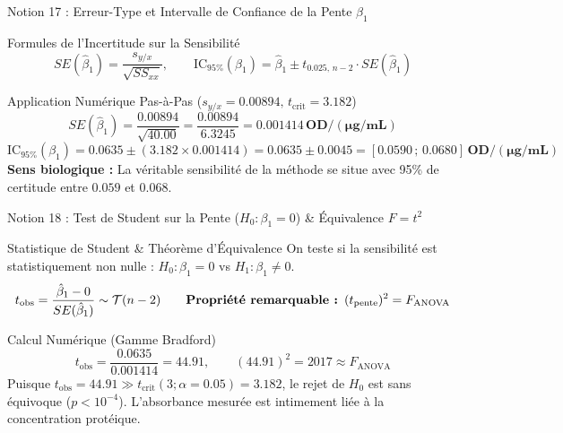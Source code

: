 \documentclass[aspectratio=169,10pt]{beamer}
\begin{document}
\begin{frame}{Notion 17 : Erreur-Type et Intervalle de Confiance de la Pente $\hat{\beta}_1$}
  \begin{conceptbox}{Formules de l'Incertitude sur la Sensibilité}
    \footnotesize
    \begin{equation*}
      SE(\hat{\beta}_1) = \frac{s_{y/x}}{\sqrt{SS_{xx}}}, \qquad \text{IC}_{95\%}(\beta_1) = \hat{\beta}_1 \pm t_{0.025, \, n-2} \cdot SE(\hat{\beta}_1)
    \end{equation*}
  \end{conceptbox}
  \vspace{1mm}
  \begin{biobox}{Application Numérique Pas-à-Pas ($s_{y/x} = 0.00894, \, t_{\text{crit}} = 3.182$)}
    \footnotesize
    \begin{equation*}
      SE(\hat{\beta}_1) = \frac{0.00894}{\sqrt{40.00}} = \frac{0.00894}{6.3245} = \mathbf{0.001414\,\text{OD}/(\mu\text{g/mL})}
    \end{equation*}
    \begin{equation*}
      \text{IC}_{95\%}(\beta_1) = 0.0635 \pm (3.182 \times 0.001414) = 0.0635 \pm 0.0045 = \mathbf{[0.0590 \,;\, 0.0680]\,\text{OD}/(\mu\text{g/mL})}
    \end{equation*}
    \textbf{Sens biologique :} La véritable sensibilité de la méthode se situe avec 95\% de certitude entre $0.059$ et $0.068$.
  \end{biobox}
\end{frame}

\begin{frame}{Notion 18 : Test de Student sur la Pente ($H_0: \beta_1 = 0$) \& Équivalence $F = t^2$}
  \begin{conceptbox}{Statistique de Student \& Théorème d'Équivalence}
    \footnotesize
    On teste si la sensibilité est statistiquement non nulle : $H_0 : \beta_1 = 0$ vs $H_1 : \beta_1 \neq 0$.
    \begin{equation*}
      t_{\text{obs}} = \frac{\hat{\beta}_1 - 0}{SE(\hat{\beta}_1)} \sim \mathcal{T}(n - 2) \qquad \text{\textbf{Propriété remarquable : }} (t_{\text{pente}})^2 = F_{\text{ANOVA}}
    \end{equation*}
  \end{conceptbox}
  \vspace{1mm}
  \begin{biobox}{Calcul Numérique (Gamme Bradford)}
    \footnotesize
    \begin{equation*}
      t_{\text{obs}} = \frac{0.0635}{0.001414} = \mathbf{44.91}, \qquad (44.91)^2 = 2017 \approx F_{\text{ANOVA}}
    \end{equation*}
    Puisque $t_{\text{obs}} = 44.91 \gg t_{\text{crit}}(3; \alpha=0.05) = 3.182$, le rejet de $H_0$ est sans équivoque ($p < 10^{-4}$).
    L'absorbance mesurée est intimement liée à la concentration protéique.
  \end{biobox}
\end{frame}
\end{document}
